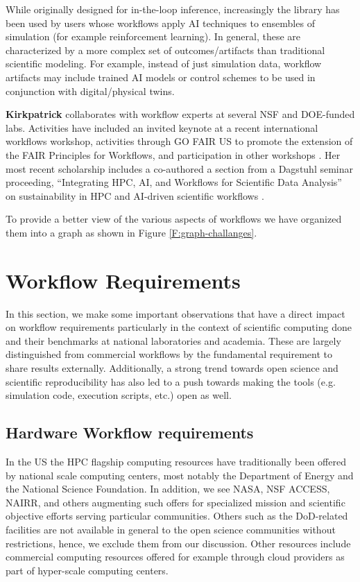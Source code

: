 \documentclass[utf8]{FrontiersinVancouver} %
\begin{document}
While originally designed for in-the-loop inference, increasingly the library has been used by users whose workflows apply AI techniques to ensembles of simulation (for example reinforcement learning). In general, these are characterized by a more complex set of outcomes/artifacts than traditional scientific modeling. For example, instead of just simulation data, workflow artifacts may include trained AI models or control schemes to be used in conjunction with digital/physical twins. 

{\bf Kirkpatrick} collaborates with workflow experts at several NSF and DOE-funded labs. Activities have included an invited keynote at a recent international workflows workshop, activities through GO FAIR US to promote the extension of the FAIR Principles for Workflows, and participation in other workshops \cite{kirkpatrick2023}. Her most recent scholarship includes a co-authored a section from a Dagstuhl seminar proceeding, ``Integrating HPC, AI, and Workflows for Scientific Data Analysis'' on sustainability in HPC and AI-driven scientific workflows \citep{badia2024integrating}.

To provide a better view of the various aspects of workflows we have organized them into a graph as shown in Figure \ref{F:graph-challanges}.




\section{Workflow Requirements}

In this section, we make some important observations that have a direct impact on workflow requirements particularly in the context of scientific computing done and their benchmarks at national laboratories and academia. These are largely distinguished from commercial workflows by the fundamental requirement to share results externally. Additionally, a strong trend towards open science and scientific reproducibility has also led to a push towards making the tools (e.g. simulation code, execution scripts, etc.) open as well.  

\subsection{Hardware Workflow requirements}\label{sec:hw-requirements}

In the US the HPC flagship computing resources have traditionally been offered by national scale computing centers, most notably the Department of Energy and the National Science Foundation. In addition, we see NASA, NSF ACCESS, NAIRR, and others augmenting such offers for specialized mission and scientific objective efforts serving particular communities. Others such as the DoD-related facilities are not available in general to the open science communities without restrictions, hence, we exclude them from our discussion. Other resources include commercial computing resources offered for example through cloud providers as part of hyper-scale computing centers.
\end{document}
